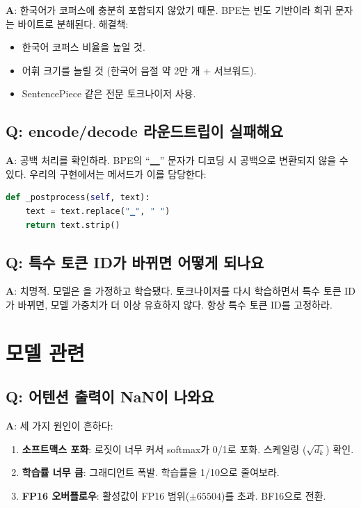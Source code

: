 \textbf{A}: 한국어가 코퍼스에 충분히 포함되지 않았기 때문. BPE는 빈도 기반이라 희귀 문자는 바이트로 분해된다. 해결책:
\begin{itemize}
  \item 한국어 코퍼스 비율을 높일 것.
  \item 어휘 크기를 늘릴 것 (한국어 음절 약 2만 개 + 서브워드).
  \item SentencePiece 같은 전문 토크나이저 사용.
\end{itemize}

\subsection{Q: encode/decode 라운드트립이 실패해요}

\textbf{A}: 공백 처리를 확인하라. BPE의 ``▁'' 문자가 디코딩 시 공백으로 변환되지 않을 수 있다. 우리의 구현에서는  메서드가 이를 담당한다:

\begin{lstlisting}[language=Python]
def _postprocess(self, text):
    text = text.replace("▁", " ")
    return text.strip()
\end{lstlisting}

\subsection{Q: 특수 토큰 ID가 바뀌면 어떻게 되나요}

\textbf{A}: 치명적. 모델은 을 가정하고 학습됐다. 토크나이저를 다시 학습하면서 특수 토큰 ID가 바뀌면, 모델 가중치가 더 이상 유효하지 않다. 항상 특수 토큰 ID를 고정하라.

\section{모델 관련}

\subsection{Q: 어텐션 출력이 NaN이 나와요}

\textbf{A}: 세 가지 원인이 흔하다:
\begin{enumerate}
  \item \textbf{소프트맥스 포화}: 로짓이 너무 커서 softmax가 0/1로 포화. 스케일링 ($\sqrt{d_k}$) 확인.
  \item \textbf{학습률 너무 큼}: 그래디언트 폭발. 학습률을 1/10으로 줄여보라.
  \item \textbf{FP16 오버플로우}: 활성값이 FP16 범위($\pm 65504$)를 초과. BF16으로 전환.
\end{enumerate}

